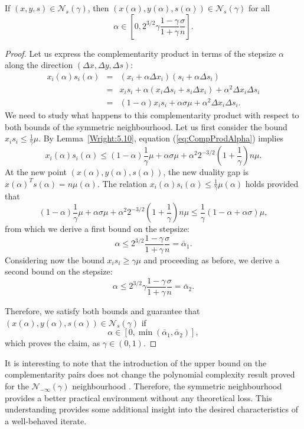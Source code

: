 \begin{theorem} \label{th:SymNeighbourhood}
  If $(x,y,s)\in\mathcal{N}_s(\gamma)$, then 
  $\left(x(\alpha),y(\alpha),s(\alpha)\right)\in\mathcal{N}_s(\gamma)$ for all
  \[
  \alpha\in \left[0,2^{3/2}\gamma\frac{1-\gamma}{1+\gamma}\frac{\sigma}{n} \right].
  \]
\end{theorem}
\begin{proof}
Let us express the complementarity product in terms of the stepsize 
$\alpha$ along the direction $(\Delta x, \Delta y, \Delta s)$:
%
\begin{eqnarray} \label{eq:CompProdAlpha}
x_i(\alpha)s_i(\alpha)&=&(x_i+\alpha\Delta x_i)(s_i+\alpha\Delta s_i)\nonumber\\ 
&=& x_is_i+\alpha(x_i\Delta s_i +s_i\Delta x_i) +\alpha^2\Delta x_i\Delta s_i\\
&=& (1-\alpha)x_is_i + \alpha\sigma\mu + \alpha^2\Delta x_i\Delta s_i.\nonumber
\end{eqnarray}
%
We need to study what happens to this complementarity product 
with respect to both bounds of the symmetric neighbourhood.
%
Let us first consider the bound $x_is_i\le \frac{1}{\gamma}\mu$.
By Lemma~\ref{Wright:5.10}, equation (\ref{eq:CompProdAlpha}) implies
\[
x_i(\alpha)s_i(\alpha) \le (1-\alpha)\frac{1}{\gamma}\mu +\alpha\sigma\mu 
+ \alpha^2 2^{-3/2}\left( 1+ \frac{1}{\gamma} \right)n\mu.
\]
At the new point $(x(\alpha),y(\alpha),s(\alpha))$, the new duality gap
is $x(\alpha)^Ts(\alpha) = n\mu(\alpha)$.
The relation $x_i(\alpha)s_i(\alpha)\le \frac{1}{\gamma}\mu(\alpha)$ 
holds provided that
\[
(1-\alpha)\frac{1}{\gamma}\mu +\alpha\sigma\mu + \alpha^2 2^{-3/2}\left( 1+ \frac{1}{\gamma} \right)n\mu 
\le\frac{1}{\gamma}(1-\alpha+\alpha\sigma)\mu,
\]
from which we derive a first bound on the stepsize:
\[
\alpha \le 2^{3/2}\frac{1-\gamma}{1+\gamma}\frac{\sigma}{n} = \bar\alpha_1.
\]
%
Considering now the bound $x_is_i\ge \gamma\mu$ and proceeding as before,
we derive a second bound on the stepsize:
\[
\alpha\le 2^{3/2}\gamma\frac{1-\gamma}{1+\gamma}\frac{\sigma}{n} =\bar\alpha_2.
\]

Therefore, we satisfy both bounds and guarantee that 
$(x(\alpha),y(\alpha),s(\alpha))\in \mathcal{N}_s(\gamma)$ if
\[
\alpha \in [0,\min(\bar\alpha_1,\bar\alpha_2)],
\]
which proves the claim, as $\gamma \in (0,1)$.
\end{proof}

It is interesting to note that the introduction of the upper bound 
on the complementarity pairs does not change the polynomial complexity 
result proved for the $\mathcal{N}_{-\infty}(\gamma)$ neighbourhood 
\cite[Theorem~5.12]{ipm:Wright97}. Therefore, the symmetric 
neighbourhood provides a better practical environment without any 
theoretical loss. This understanding provides some additional 
insight into the desired characteristics of a well-behaved iterate.

